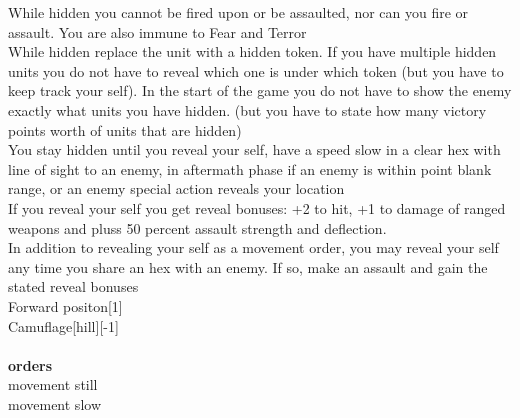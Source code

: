 While hidden you cannot be fired upon or be assaulted, nor can you fire or assault. You are also immune to Fear and Terror\\ 
While hidden replace the unit with a hidden token. If you have multiple hidden units you do not have to reveal which one is under which token (but you have to keep track your self). In the start of the game you do not have to show the enemy exactly what units you have hidden. (but you have to state how many victory points worth of units that are hidden)\\ 
You stay hidden until you reveal your self, have a speed slow in a clear hex with line of sight to an enemy, in aftermath phase if an enemy is within point blank range, or an enemy special action reveals your location\\ 
If you reveal your self you get reveal bonuses: +2 to hit, +1 to damage of ranged weapons and pluss 50 percent assault strength and deflection.\\ 
In addition to revealing your self as a movement order, you may reveal your self any time you share an hex with an enemy. If so, make an assault and gain the stated reveal bonuses\\ 
Forward positon[1]\\ 
Camuflage[hill][-1]\\ 








\ \\ {\bf orders } \\
movement still \\
movement slow \\

